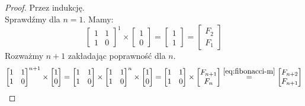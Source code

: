 \begin{proof}Przez indukcję.\\
  Sprawdźmy dla $n = 1$. Mamy:
  \begin{equation*}
    \begin{bmatrix}1 & 1 \\ 1 & 0\end{bmatrix}^1
    \times
    \begin{bmatrix}1 \\ 0\end{bmatrix}
    =
    \begin{bmatrix}1 \\ 1\end{bmatrix} = \begin{bmatrix}F_2 \\ F_1\end{bmatrix}
  \end{equation*}
  Rozważmy $n + 1$ zakładając poprawność dla $n$.
  \begin{equation*}
    \begin{bmatrix}
      1 & 1 \\
      1 & 0
    \end{bmatrix}^{n + 1}
    \times
    \begin{bmatrix}1 \\ 0\end{bmatrix}
    =
    \begin{bmatrix}
      1 & 1 \\
      1 & 0
    \end{bmatrix}
    \times
    \begin{bmatrix}
      1 & 1 \\
      1 & 0
    \end{bmatrix}^{n}
    \times
    \begin{bmatrix}1 \\ 0\end{bmatrix}
    =
    \begin{bmatrix}
      1 & 1 \\
      1 & 0
    \end{bmatrix}
    \times
    \begin{bmatrix}F_{n+1} \\ F_{n}\end{bmatrix}
    \stackrel{\ref{eq:fibonacci-m}}{=}
    \begin{bmatrix}F_{n + 2} \\ F_{n + 1}\end{bmatrix}
  \end{equation*}
\end{proof}

